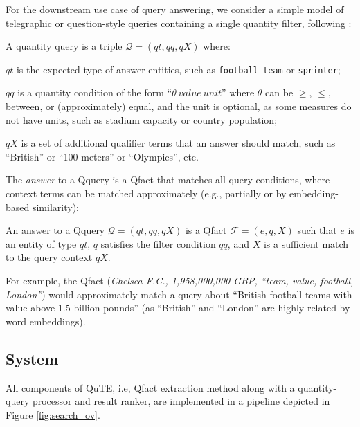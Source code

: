 \vspace{0.1cm}
For the downstream use case of query answering, we consider a simple model of telegraphic or question-style
queries containing a single quantity filter,
following \cite{DBLP:conf/semweb/HoIPBW19}:

\vspace{0.1cm}
A quantity query is a triple $\mathcal{Q} = (qt, qq, qX)$ where:
\squishlist
\item[-] $qt$ is the expected type of answer entities,
such as {\small\tt football team}
or {\small\tt sprinter};
\item[-] $qq$ is a quantity condition of the form ``$\theta ~\textit{value} ~\textit{unit}$'' where $\theta$ can be $\ge$, $\le$, between, or (approximately) equal,
and the unit is optional, as some measures do not have units, such as stadium capacity or country population;
\item[-] $qX$ is a set of additional qualifier terms
that an answer should match, such as ``British'' or ``100 meters'' or ``Olympics'', etc.
\squishend

\vspace{0.1cm}
The \textit{answer} to a Qquery is a Qfact that matches all query conditions, where context terms can be matched approximately (e.g., partially or by embedding-based
similarity):

\vspace{0.1cm}
An answer to a Qquery $\mathcal{Q} = (qt, qq, qX)$
is a Qfact $\mathcal{F} = (e, q, X)$ such that
$e$ is an entity of type $qt$,
$q$ satisfies the filter condition $qq$, and
$X$ is a sufficient match to the query context $qX$.
\vspace{0.1cm}

For example, the Qfact 
 (\textit{Chelsea F.C., 1,958,000,000 GBP,
``team, value, football, London''})
would approximately match a query about
``British football teams with value above 1.5 billion pounds'' (as ``British'' and ``London'' are highly
related by word embeddings).

\subsection{System}


All components of QuTE, i.e, Qfact extraction method along with a quantity-query processor and
result ranker, are implemented in a 
pipeline depicted in Figure \ref{fig:search_ov}.

